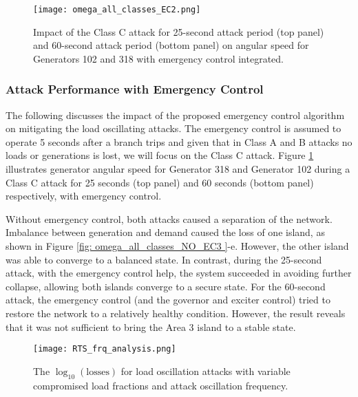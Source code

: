 \documentclass[journal]{IEEEtran}
\begin{document}
\begin{figure}[t]
\texttt{[image: omega\_all\_classes\_EC2.png]}
\caption{Impact of the Class C attack for 25-second attack period (top panel) and 60-second attack period (bottom panel) on angular speed for Generators 102 and 318 with emergency control integrated.}
\label{fig: omega_all_classes_EC}
\end{figure}
              




\subsubsection{Attack Performance with Emergency Control}
The following discusses the impact of the proposed emergency control algorithm on mitigating the load oscillating attacks. The emergency control is assumed to operate 5 seconds after a branch trips and given that in Class A and B attacks no loads or generations is lost, we will focus on the Class C attack. Figure \ref{fig: omega_all_classes_EC} illustrates generator angular speed for Generator 318 and Generator 102 during a Class C attack for 25 seconds (top panel) and 60 seconds (bottom panel) respectively, with emergency control. 


Without emergency control, both attacks caused a separation of the network. Imbalance between generation and demand caused the loss of one island, as shown in Figure \ref{fig: omega_all_classes_NO_EC3 }-e. However, the other island was able to converge to a balanced state. In contrast, during the 25-second attack, with the emergency control help, the system succeeded in avoiding further collapse, allowing both islands converge to a secure state. For the 60-second attack, the emergency control (and the governor and exciter control) tried to restore the network to a relatively healthy condition. However, the result reveals that it was not sufficient to bring the Area 3 island to a stable state.  

\begin{figure}[t]
\centering
\texttt{[image: RTS\_frq\_analysis.png]}
\caption{The $\log_{10} (\text{losses})$ for load oscillation attacks with variable compromised load fractions and attack oscillation frequency.}
\label{fig: RTS_freq}
\end{figure} 
\end{document}
